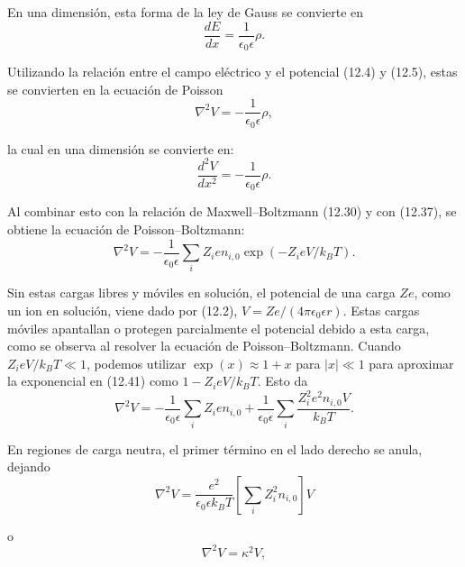 \documentclass[12pt]{book}
\begin{document}
En una dimensión, esta forma de la ley de Gauss se convierte en
\begin{equation}
\frac{dE}{dx} = \frac{1}{\epsilon_0 \epsilon} \rho. \label{eq:12.38}
\end{equation}

Utilizando la relación entre el campo eléctrico y el potencial (12.4) y (12.5), estas se convierten en la ecuación de Poisson
\begin{equation}
\nabla^2 V = -\frac{1}{\epsilon_0 \epsilon} \rho, \label{eq:12.39}
\end{equation}

la cual en una dimensión se convierte en:
\begin{equation}
\frac{d^2V}{dx^2} = -\frac{1}{\epsilon_0 \epsilon} \rho. \label{eq:12.40}
\end{equation}

Al combinar esto con la relación de Maxwell--Boltzmann (12.30) y con (12.37), se obtiene la ecuación de Poisson--Boltzmann:
\begin{equation}
\nabla^2 V = -\frac{1}{\epsilon_0 \epsilon} \sum_i Z_i e n_{i,0} \exp(-Z_i e V / k_B T). \label{eq:12.41}
\end{equation}

Sin estas cargas libres y móviles en solución, el potencial de una carga $Ze$, como un ion en solución, viene dado por (12.2), $V = Ze / (4\pi\epsilon_0\epsilon r)$. Estas cargas móviles apantallan o protegen parcialmente el potencial debido a esta carga, como se observa al resolver la ecuación de Poisson--Boltzmann. Cuando $Z_i e V / k_B T \ll 1$, podemos utilizar $\exp(x) \approx 1 + x$ para $|x| \ll 1$ para aproximar la exponencial en (12.41) como $1 - Z_i e V / k_B T$. Esto da
\begin{equation}
\nabla^2 V = -\frac{1}{\epsilon_0 \epsilon} \sum_i Z_i e n_{i,0} + \frac{1}{\epsilon_0 \epsilon} \sum_i \frac{Z_i^2 e^2 n_{i,0} V}{k_B T}. \label{eq:12.42}
\end{equation}

En regiones de carga neutra, el primer término en el lado derecho se anula, dejando
\begin{equation}
\nabla^2 V = \frac{e^2}{\epsilon_0\epsilon k_B T} \left[ \sum_i Z_i^2 n_{i,0} \right] V \label{eq:12.43}
\end{equation}

o
\begin{equation}
\nabla^2 V = \kappa^2 V, \label{eq:12.44}
\end{equation}
\end{document}
